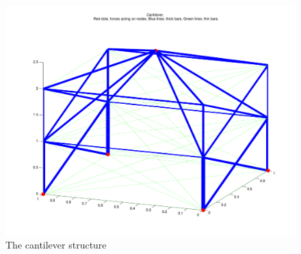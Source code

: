 \begin{figure}[H]
\centerline{\includegraphics[scale=0.4]{../Ferdig kode/cantilever.pdf}}
\caption{The cantilever structure}
\label{fig:cantilever}
\end{figure}